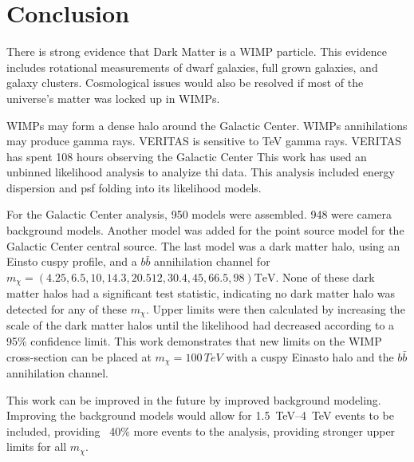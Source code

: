 \cleartooddpage[\thispagestyle{empty}]
\chapter{Conclusion}

There is strong evidence that Dark Matter is a WIMP particle.
This evidence includes rotational measurements of dwarf galaxies, full grown galaxies, and galaxy clusters.
Cosmological issues would also be resolved if most of the universe's matter was locked up in WIMPs.

WIMPs may form a dense halo around the Galactic Center.
WIMPs annihilations may produce gamma rays.
VERITAS is sensitive to TeV gamma rays.
VERITAS has spent 108 hours observing the Galactic Center
This work has used an unbinned likelihood analysis to analyize thi data.
This analysis included energy dispersion and psf folding into its likelihood models.

For the Galactic Center analysis, 950 models were assembled.
948 were camera background models.
Another model was added for the point source model for the Galactic Center central source.
The last model was a dark matter halo, using an Einsto cuspy profile, and a $b\bar{b}$ annihilation channel for $m_{\chi}=(4.25,6.5, 10, 14.3, 20.512, 30.4, 45, 66.5, 98) \textrm{TeV}$.
None of these dark matter halos had a significant test statistic, indicating no dark matter halo was detected for any of these $m_{\chi}$.
Upper limits were then calculated by increasing the scale of the dark matter halos until the likelihood had decreased according to a 95\% confidence limit.
This work demonstrates that new limits on the WIMP cross-section can be placed at $m_{\chi}=100\,TeV$ with a cuspy Einasto halo and the $b\bar{b}$ annihilation channel.

This work can be improved in the future by improved background modeling.
Improving the background models would allow for \SIrange{1.5}{4}{TeV} events to be included, providing ~40\% more events to the analysis, providing stronger upper limits for all $m_{\chi}$.

